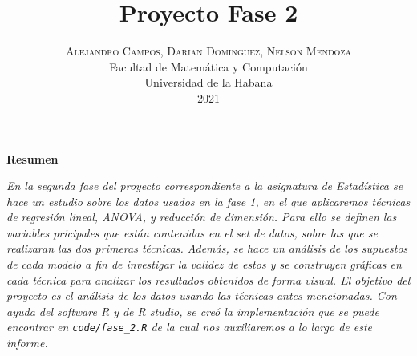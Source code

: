 \documentclass[twoside]{article}
\title{\vspace{-0.5cm}\fontsize{20pt}{10pt}\selectfont\textbf{Proyecto Fase 2}}
\author{
\large
\textsc{\vspace{-2cm} Alejandro Campos, Darian Dominguez, Nelson Mendoza}\\[3.5cm]
\normalsize Facultad de Matem\'atica y Computaci\'on \\
\normalsize Universidad de la Habana \\
\normalsize 2021 \\[1cm]
\vspace{-5mm}
}
\date{}
\begin{document}
\maketitle

\thispagestyle{fancy} 

\begin{center}
\textbf{Resumen}
\end{center}
\noindent \textit{En la segunda fase del proyecto correspondiente a la asignatura de Estad\'istica se hace un estudio sobre los datos usados en la fase 1, en el que aplicaremos t\'ecnicas de regresi\'on lineal, ANOVA, y reducci\'on de dimensi\'on. Para ello se definen las variables pricipales que est\'an contenidas en el set de datos, sobre las que se realizaran las dos primeras t\'ecnicas. Adem\'as, se hace un an\'alisis de los supuestos de cada modelo a fin de investigar la validez de estos y se construyen gr\'aficas en cada t\'ecnica para analizar los resultados obtenidos de forma visual. El objetivo del proyecto es el an\'alisis de los datos usando las t\'ecnicas antes mencionadas. Con ayuda del software R y de R studio, se cre\'o la implementaci\'on que se puede encontrar en \texttt{code/fase\_2.R} de la cual nos auxiliaremos a lo largo de este informe.}\\[0.5cm]
\end{document}
